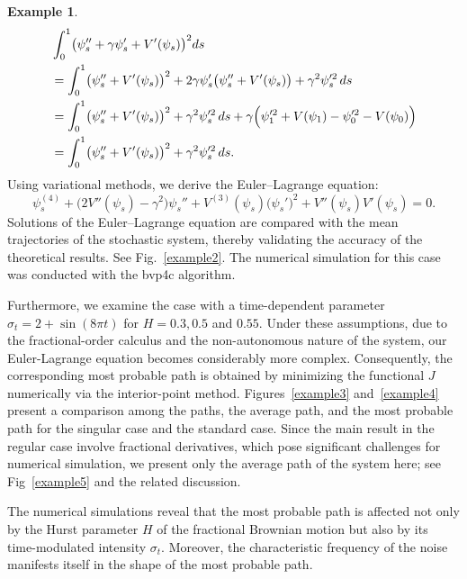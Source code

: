 \documentclass{article}
\theoremstyle{definition}  %
\newtheorem{example}{Example}[section]
\theoremstyle{plain}  %
\begin{document}
\begin{example}
\begin{align*}
    &\int_0^1 \bigl( \psi_s'' + \gamma \psi_s' + V'(\psi_s) \bigr)^2 ds \\
    &= \int_0^1 \bigl( \psi_s'' + V'(\psi_s) \bigr)^2 + 2\gamma \psi_s' \bigl( \psi_s'' + V'(\psi_s) \bigr) + \gamma^2 \psi_s'^2 \, ds \\
    &= \int_0^1 \bigl( \psi_s'' + V'(\psi_s) \bigr)^2 + \gamma^2 \psi_s'^2 \, ds 
       + \gamma \Bigl( \psi_1'^2 + V(\psi_1) - \psi_0'^2 - V(\psi_0) \Bigr) \\
    &= \int_0^1 \bigl( \psi_s'' + V'(\psi_s) \bigr)^2 + \gamma^2 \psi_s'^2 \, ds .
\end{align*}
Using variational methods, we derive the Euler--Lagrange equation:
\begin{equation*}
    \psi_s^{(4)} + \bigl( 2V''(\psi_s) - \gamma^2 \bigr) \psi_s'' 
    + V^{(3)}(\psi_s) \bigl( \psi_s' \bigr)^2 
    + V''(\psi_s) V'(\psi_s) = 0 .
\end{equation*}
Solutions of the Euler--Lagrange equation are compared with the mean trajectories of the stochastic system, thereby validating the accuracy of the theoretical results. See Fig.~\ref{example2}.   The numerical simulation for this case was conducted with the bvp4c algorithm.

Furthermore, we examine the case with a time-dependent parameter $\sigma_t = 2 + \sin(8\pi t)$ for $H = 0.3 ,  0.5$ and $0.55$. Under these  assumptions, due to the fractional-order calculus and the non-autonomous nature of the system, our Euler-Lagrange equation becomes considerably more complex. Consequently, the corresponding most probable path is obtained by minimizing the functional $J$ numerically via the interior-point method. Figures~\ref{example3} and~\ref{example4} present a comparison among the paths, the average path, and the most probable path for the singular case and the standard case. Since the main result in the regular case involve fractional derivatives, which pose significant challenges for numerical simulation, we present only the average path of the system here; see Fig~\ref{example5} and the related discussion. 

The numerical simulations reveal that the most probable path is affected not only by the Hurst parameter $H$ of the fractional Brownian motion but also by its time-modulated intensity $\sigma_t$. Moreover, the characteristic frequency of the noise manifests itself in the shape of the most probable path.
  


  
\end{example}
\end{document}
